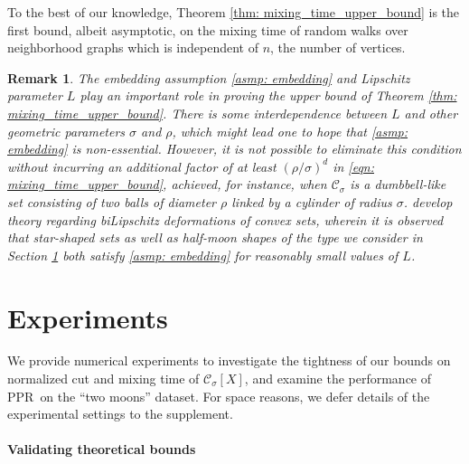\documentclass{article}
\newcommand{\1}{\mathbf{1}}
\newcommand{\Xbf}{X}             %
\newcommand{\Cset}{\mathcal{C}}
\newcommand{\Csig}{\Cset_{\sigma}}
\newcommand{\pprspace}{{\sc PPR~}}
\theoremstyle{aldenthm}
\theoremstyle{aldenrmrk}
\newtheorem{remark}{Remark}
\begin{document}
To the best of our knowledge, Theorem \ref{thm: mixing_time_upper_bound} is the first bound, albeit asymptotic, on the mixing time of random walks over neighborhood graphs which is independent of $n$, the number of vertices.
\begin{remark}
	The embedding assumption \ref{asmp: embedding} and Lipschitz parameter $L$ play an important role in proving the upper bound of Theorem \ref{thm: mixing_time_upper_bound}. There is some interdependence between $L$ and other geometric parameters $\sigma$ and $\rho$, which might lead one to hope that \ref{asmp: embedding} is non-essential. However, it is not possible to eliminate this condition without incurring an additional factor of at least $(\rho/\sigma)^d$ in \eqref{eqn: mixing_time_upper_bound}, achieved, for instance, when $\Csig$ is a dumbbell-like set consisting of two balls of diameter $\rho$ linked by a cylinder of radius $\sigma$.  \citep{abbasi-yadkori2016, abbasi-yadkori2016a} develop theory regarding biLipschitz deformations of convex sets, wherein it is observed that star-shaped sets as well as half-moon shapes of the type we consider in Section \ref{sec: experiments} both satisfy \ref{asmp: embedding} for reasonably small values of $L$.
\end{remark}

\section{Experiments}
\label{sec: experiments}

We provide numerical experiments to investigate the tightness of our bounds on normalized cut and mixing time of $\Csig[\Xbf]$, and examine the performance of \pprspace on the ``two moons'' dataset. For space reasons, we defer details of the experimental settings to the supplement.

\paragraph{Validating theoretical bounds}
\end{document}
